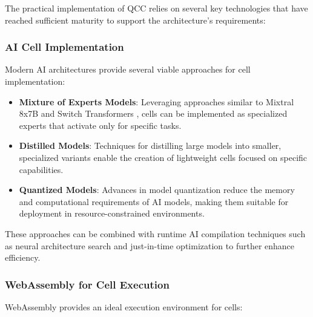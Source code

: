 \documentclass[11pt,a4paper]{article}
\begin{document}
The practical implementation of QCC relies on several key technologies that have reached sufficient maturity to support the architecture's requirements:

\subsubsection{AI Cell Implementation}

Modern AI architectures provide several viable approaches for cell implementation:

\begin{itemize}
    \item \textbf{Mixture of Experts Models}: Leveraging approaches similar to Mixtral 8x7B \cite{mixtral} and Switch Transformers \cite{switch}, cells can be implemented as specialized experts that activate only for specific tasks.
    
    \item \textbf{Distilled Models}: Techniques for distilling large models into smaller, specialized variants \cite{distillation} enable the creation of lightweight cells focused on specific capabilities.
    
    \item \textbf{Quantized Models}: Advances in model quantization \cite{quantization} reduce the memory and computational requirements of AI models, making them suitable for deployment in resource-constrained environments.
\end{itemize}

These approaches can be combined with runtime AI compilation techniques such as neural architecture search \cite{nas} and just-in-time optimization \cite{jit} to further enhance efficiency.

\subsubsection{WebAssembly for Cell Execution}

WebAssembly provides an ideal execution environment for cells:
\end{document}
